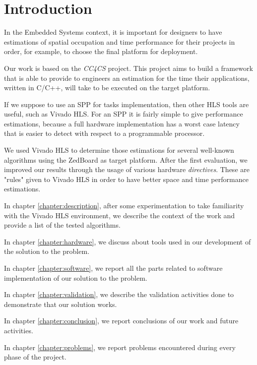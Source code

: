 \chapter*{Introduction}

In the Embedded Systems context, it is important for designers to have estimations of spatial occupation and time performance for their projects in order, for example, to choose the final platform for deployment.

Our work is based on the \textit{CC4CS} project\cite{cc4cs_git}. This project aims to build a framework that is able to provide to engineers an estimation for the time their applications, written in C/C++, will take to be executed on the target platform.

If we suppose to use an SPP for tasks implementation, then other HLS tools are useful, such as Vivado HLS\cite{vivado_hls}. For an SPP it is fairly simple to give performance estimations, because a full hardware implementation has a worst case latency that is easier to detect with respect to a programmable processor.

We used Vivado HLS to determine those estimations for several well-known algorithms using the ZedBoard as target platform\cite{zedboard}. After the first evaluation, we improved our results through the usage of various hardware \emph{directives}. These are "rules" given to Vivado HLS in order to have better space and time performance estimations.

In chapter \ref{chapter:description}, after some experimentation to take familiarity with the Vivado HLS environment, we describe the context of the work and provide a list of the tested algorithms.

In chapter \ref{chapter:hardware}, we discuss about tools used in our development of the solution to the problem.

In chapter \ref{chapter:software}, we report all the parts related to software implementation of our solution to the problem.

In chapter \ref{chapter:validation}, we describe the validation activities done to demonstrate that our solution works.

In chapter \ref{chapter:conclusion}, we report conclusions of our work and future activities.

In chapter \ref{chapter:problems}, we report problems encountered during every phase of the project.